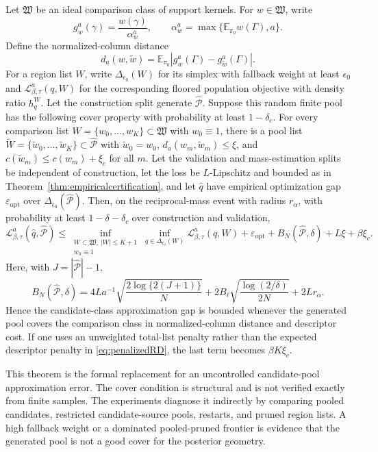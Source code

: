 \documentclass[twoside,11pt]{article}
\newcommand{\E}{\mathbb{E}}
\begin{document}
\begin{theorem}
\label{thm:oraclecover}
Let \(\mathfrak W\) be an ideal comparison class of support kernels. For \(w\in\mathfrak W\), write
\[
g_w^a(\gamma)=\frac{w(\gamma)}{\alpha_w^a}, \qquad \alpha_w^a=\max\{\E_{\pi_0}w(\Gamma),a\}.
\]
Define the normalized-column distance
\[
d_a(w,\widetilde w) = \E_{\pi_0}\left|g_w^a(\Gamma)-g_{\widetilde w}^a(\Gamma)\right|.
\]
For a region list \(W\), write \(\Delta_{\epsilon_0}(W)\) for its simplex with fallback weight at least \(\epsilon_0\) and \(\mathcal L_{\beta,\tau}^a(q,W)\) for the corresponding floored population objective with density ratio \(h_q^W\). Let the construction split generate \(\widehat{\mathcal P}\). Suppose this random finite pool has the following cover property with probability at least \(1-\delta_c\). For every comparison list \(W=\{w_0,\dots,w_K\}\subset\mathfrak W\) with \(w_0\equiv1\), there is a pool list \(\widetilde W=\{\widetilde w_0,\dots,\widetilde w_K\}\subset\widehat{\mathcal P}\) with \(\widetilde w_0=w_0\), \(d_a(w_m,\widetilde w_m)\le\xi\), and \(c(\widetilde w_m)\le c(w_m)+\xi_c\) for all \(m\). Let the validation and mass-estimation splits be independent of construction, let the loss be \(L\)-Lipschitz and bounded as in Theorem~\ref{thm:empiricalcertification}, and let \(\widehat q\) have empirical optimization gap \(\varepsilon_{\mathrm{opt}}\) over \(\Delta_{\epsilon_0}(\widehat{\mathcal P})\). Then, on the reciprocal-mass event with radius \(r_\alpha\), with probability at least \(1-\delta-\delta_c\) over construction and validation,
\[
\mathcal L_{\beta,\tau}^a(\widehat q,\widehat{\mathcal P}) \le \inf_{\substack{W\subset\mathfrak W,\ |W|\le K+1\\ w_0\equiv1}} \inf_{q\in\Delta_{\epsilon_0}(W)} \mathcal L_{\beta,\tau}^a(q,W) + \varepsilon_{\mathrm{opt}} + B_N(\widehat{\mathcal P},\delta) + L\xi+\beta \xi_c .
\]
Here, with \(J=|\widehat{\mathcal P}|-1\),
\[
B_N(\widehat{\mathcal P},\delta) = 4La^{-1}\sqrt{\frac{2\log\{2(J+1)\}}{N}} + 2B_\ell\sqrt{\frac{\log(2/\delta)}{2N}} + 2Lr_\alpha .
\]
Hence the candidate-class approximation gap is bounded whenever the generated pool covers the comparison class in normalized-column distance and descriptor cost. If one uses an unweighted total-list penalty rather than the expected descriptor penalty in \eqref{eq:penalizedRD}, the last term becomes \(\beta K\xi_c\).
\end{theorem}

This theorem is the formal replacement for an uncontrolled candidate-pool approximation error. The cover condition is structural and is not verified exactly from finite samples. The experiments diagnose it indirectly by comparing pooled candidates, restricted candidate-source pools, restarts, and pruned region lists. A high fallback weight or a dominated pooled-pruned frontier is evidence that the generated pool is not a good cover for the posterior geometry.
\end{document}

